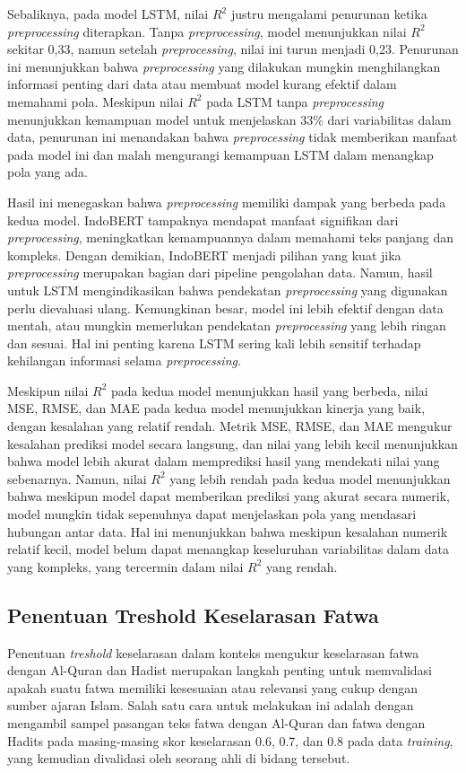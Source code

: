 \documentclass[12pt,a4paper]{article}
\begin{document}
\begin{itemize}
    Sebaliknya, pada model LSTM, nilai $R^2$ justru mengalami penurunan ketika \textit{preprocessing} diterapkan. Tanpa \textit{preprocessing}, model menunjukkan nilai $R^2$ sekitar 0,33, namun setelah \textit{preprocessing}, nilai ini turun menjadi 0,23. Penurunan ini menunjukkan bahwa \textit{preprocessing} yang dilakukan mungkin menghilangkan informasi penting dari data atau membuat model kurang efektif dalam memahami pola. Meskipun nilai $R^2$ pada LSTM tanpa \textit{preprocessing} menunjukkan kemampuan model untuk menjelaskan 33\% dari variabilitas dalam data, penurunan ini menandakan bahwa \textit{preprocessing} tidak memberikan manfaat pada model ini dan malah mengurangi kemampuan LSTM dalam menangkap pola yang ada.
    
    Hasil ini menegaskan bahwa \textit{preprocessing} memiliki dampak yang berbeda pada kedua model. IndoBERT tampaknya mendapat manfaat signifikan dari \textit{preprocessing}, meningkatkan kemampuannya dalam memahami teks panjang dan kompleks. Dengan demikian, IndoBERT menjadi pilihan yang kuat jika \textit{preprocessing} merupakan bagian dari pipeline pengolahan data. Namun, hasil untuk LSTM mengindikasikan bahwa pendekatan \textit{preprocessing} yang digunakan perlu dievaluasi ulang. Kemungkinan besar, model ini lebih efektif dengan data mentah, atau mungkin memerlukan pendekatan \textit{preprocessing} yang lebih ringan dan sesuai. Hal ini penting karena LSTM sering kali lebih sensitif terhadap kehilangan informasi selama \textit{preprocessing}.
    
    Meskipun nilai $R^2$ pada kedua model menunjukkan hasil yang berbeda, nilai MSE, RMSE, dan MAE pada kedua model menunjukkan kinerja yang baik, dengan kesalahan yang relatif rendah. Metrik MSE, RMSE, dan MAE mengukur kesalahan prediksi model secara langsung, dan nilai yang lebih kecil menunjukkan bahwa model lebih akurat dalam memprediksi hasil yang mendekati nilai yang sebenarnya. Namun, nilai $R^2$ yang lebih rendah pada kedua model menunjukkan bahwa meskipun model dapat memberikan prediksi yang akurat secara numerik, model mungkin tidak sepenuhnya dapat menjelaskan pola yang mendasari hubungan antar data. Hal ini menunjukkan bahwa meskipun kesalahan numerik relatif kecil, model belum dapat menangkap keseluruhan variabilitas dalam data yang kompleks, yang tercermin dalam nilai $R^2$ yang rendah.
\end{itemize}

\subsection{Penentuan Treshold Keselarasan Fatwa}
Penentuan \textit{treshold} keselarasan dalam konteks mengukur keselarasan fatwa dengan Al-Quran dan Hadist merupakan langkah penting untuk memvalidasi apakah suatu fatwa memiliki kesesuaian atau relevansi yang cukup dengan sumber ajaran Islam. Salah satu cara untuk melakukan ini adalah dengan mengambil sampel pasangan teks fatwa dengan Al-Quran dan fatwa dengan Hadits pada masing-masing skor keselarasan 0.6, 0.7, dan 0.8 pada data \textit{training}, yang kemudian divalidasi oleh seorang ahli di bidang tersebut.
\end{document}
